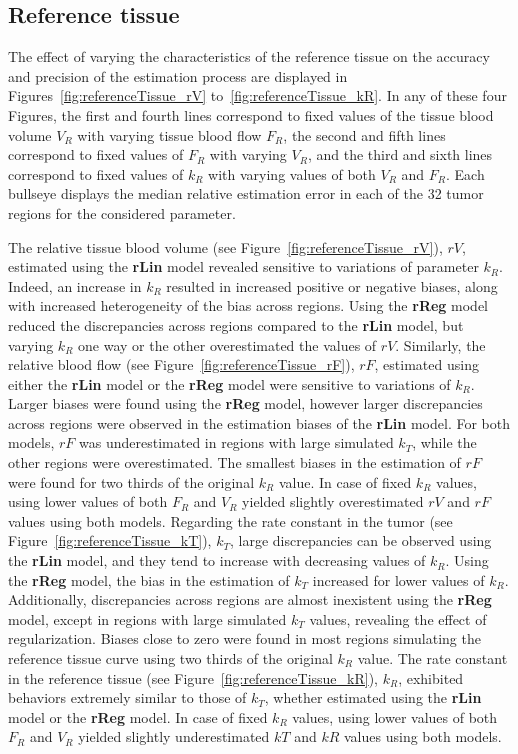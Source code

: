 \subsection{Reference tissue}
The effect of varying the characteristics of the reference tissue on the accuracy and precision of the estimation process are displayed in Figures~\ref{fig:referenceTissue_rV} to~\ref{fig:referenceTissue_kR}. 
In any of these four Figures, the first and fourth lines correspond to fixed values of the tissue blood volume $V_R$ with varying tissue blood flow $F_R$, the second and fifth lines correspond to fixed values of $F_R$ with varying $V_R$, and the third and sixth lines correspond to fixed values of $k_R$ with varying values of both $V_R$ and $F_R$.
Each bullseye displays the median relative estimation error in each of the 32 tumor regions for the considered parameter.

The relative tissue blood volume (see Figure~\ref{fig:referenceTissue_rV}), $rV$, estimated using the \textbf{rLin} model revealed sensitive to variations of parameter $k_R$.
Indeed, an increase in $k_R$ resulted in increased positive or negative biases, along with increased heterogeneity of the bias across regions.
Using the \textbf{rReg} model reduced the discrepancies across regions compared to the \textbf{rLin} model, but varying $k_R$ one way or the other overestimated the values of $rV$.
Similarly, the relative blood flow (see Figure~\ref{fig:referenceTissue_rF}), $rF$, estimated using either the \textbf{rLin} model or the \textbf{rReg} model were sensitive to variations of $k_R$. 
Larger biases were found using the \textbf{rReg} model, however larger discrepancies across regions were observed in the estimation biases of the \textbf{rLin} model.
For both models, $rF$ was underestimated in regions with large simulated $k_T$, while the other regions were overestimated.
The smallest biases in the estimation of $rF$ were found for two thirds of the original $k_R$ value.
In case of fixed $k_R$ values, using lower values of both $F_R$ and $V_R$ yielded slightly overestimated $rV$ and $rF$ values using both models.
Regarding the rate constant in the tumor (see Figure~\ref{fig:referenceTissue_kT}), $k_T$, large discrepancies can be observed using the \textbf{rLin} model, and they tend to increase with decreasing values of $k_R$.
Using the \textbf{rReg} model, the bias in the estimation of $k_T$ increased for lower values of $k_R$.
Additionally, discrepancies across regions are almost inexistent using the \textbf{rReg} model, except in regions with large simulated $k_T$ values, revealing the effect of regularization.
Biases close to zero were found in most regions simulating the reference tissue curve using two thirds of the original $k_R$ value.
The rate constant in the reference tissue (see Figure~\ref{fig:referenceTissue_kR}), $k_R$, exhibited behaviors extremely similar to those of $k_T$, whether estimated using the \textbf{rLin} model or the \textbf{rReg} model.
In case of fixed $k_R$ values, using lower values of both $F_R$ and $V_R$ yielded slightly underestimated $kT$ and $kR$ values using both models.

